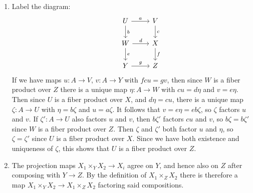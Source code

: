 \documentclass{report}
\begin{document}
\begin{enumerate}[label=\textbf{1.3.\Alph*.}]
	\item Label the diagram:
	      \begin{equation*}
		      \begin{tikzcd}
			      &U \arrow{r}{a} \arrow{d}{b} &V \arrow{d}{c} \\
			      &W \arrow{r}{d} \arrow{d}{e} &X \arrow{d}{f} \\
			      &Y \arrow{r}{g} &Z
		      \end{tikzcd}
	      \end{equation*}
	      If we have maps $u:A\to V$, $v:A\to Y$ with $fcu=gv$, then since $W$
	      is a fiber product over $Z$ there is a unique map $\eta:A\to W$
	      with $cu=d\eta$ and $v=e\eta$. Then since $U$ is a fiber product
	      over $X$, and $d\eta=cu$, there is a unique map $\zeta:A\to U$ with
	      $\eta=b\zeta$ and $u=a\zeta$. It follows that $v=e\eta=eb\zeta$, so
	      $\zeta$ factors $u$ and $v$. If $\zeta':A\to U$ also factors $u$ and
	      $v$, then $b\zeta'$ factors $cu$ and $v$, so $b\zeta=b\zeta'$ since
	      $W$ is a fiber product over $Z$. Then $\zeta$ and $\zeta'$ both
	      factor $u$ and $\eta$, so $\zeta=\zeta'$ since $U$ is a fiber
	      product over $X$. Since we have both existence and uniqueness of
	      $\zeta$, this shows that $U$ is a fiber product over $Z$.

	\item The projection maps $X_1\times_YX_2\to X_i$ agree on $Y$, and
	      hence also on $Z$ after composing with $Y\to Z$. By the
	      definition of $X_1\times_ZX_2$ there is therefore a map
	      $X_1\times_YX_2\to X_1\times_ZX_2$ factoring said compositions.


\end{enumerate}
\end{document}
